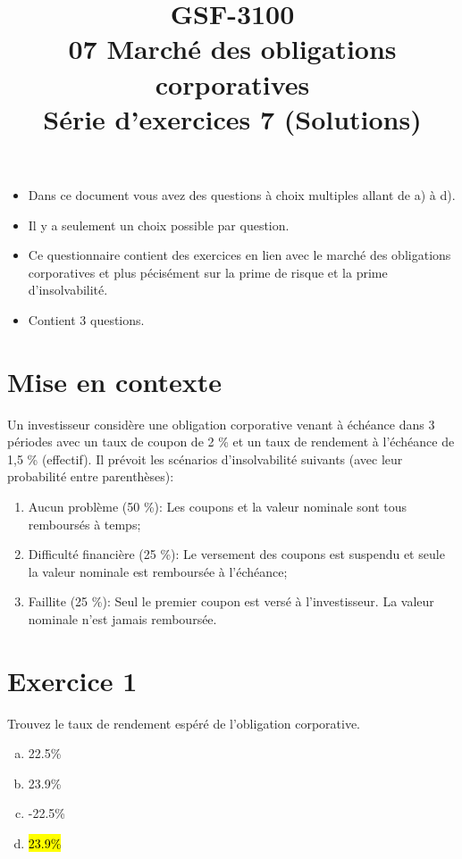 \documentclass[10pt,a4paper]{article}
\title{GSF-3100 \\
07 Marché des obligations corporatives \\
Série d'exercices 7 (Solutions)}
\begin{document}
\maketitle

\begin{itemize}
\item Dans ce document vous avez des questions à choix multiples allant de a) à d).  
\item Il y a seulement un choix possible par question.
\item Ce questionnaire contient des exercices en lien avec le marché des obligations corporatives et plus pécisément sur la prime de risque et la prime d'insolvabilité.
\item Contient 3 questions. 
\end{itemize}
 
\newpage

\section*{Mise en contexte}

Un investisseur considère une obligation corporative venant à échéance dans 3 périodes avec un taux de coupon de 2 \% et un taux de rendement à l’échéance de 1,5 \% (effectif). Il prévoit les scénarios d’insolvabilité suivants (avec leur probabilité entre parenthèses): 

\begin{enumerate}
\item Aucun problème (50 \%): Les coupons et la valeur nominale sont tous remboursés à temps;

\item Difficulté financière (25 \%): Le versement des coupons est suspendu et seule la valeur nominale est remboursée à l'échéance;

\item Faillite (25 \%): Seul le premier coupon est versé à l'investisseur. La valeur nominale n'est jamais remboursée.
\end{enumerate}

\section*{Exercice 1}
Trouvez le taux de rendement espéré de l'obligation corporative.

\begin{enumerate}[a)]
\item 22.5\%
\item 23.9\%
\item -22.5\%
\item \hl{23.9\%}
\end{enumerate}
\end{document}
